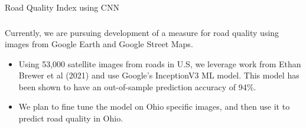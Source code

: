 \documentclass{beamer}
\begin{document}
\begin{frame}{Road Quality Index using CNN}
\frametitle{}
Currently, we are pursuing development of a measure for road quality using images from Google Earth and Google Street Maps.

\begin{itemize}
    \item Using 53,000 satellite images from roads in U.S, we leverage work from Ethan Brewer et al (2021) and use Google's InceptionV3 ML model. This model has been shown to have an out-of-sample prediction accuracy of 94\%.
    \item We plan to fine tune the model on Ohio specific images, and then use it to predict road quality in Ohio. 
\end{itemize}

\end{frame}
\end{document}
